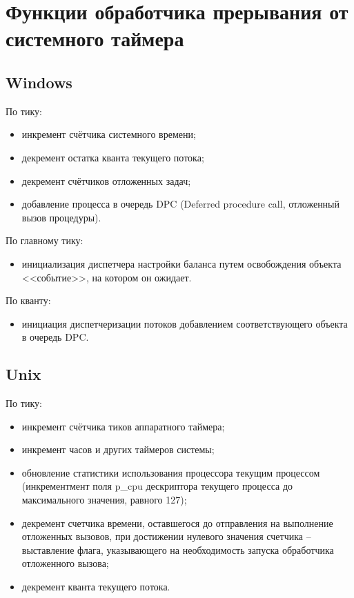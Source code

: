 \chapter{Функции обработчика прерывания от системного таймера}


\section{Windows}

По тику:
\begin{itemize}
	\item инкремент счётчика системного времени;
	\item декремент остатка кванта текущего потока;
	\item декремент счётчиков отложенных задач;
	\item добавление процесса в очередь DPC (Deferred procedure call, отложенный вызов процедуры). 
\end{itemize}

По главному тику: 
\begin{itemize}
	\item инициализация диспетчера настройки баланса путем освобождения объекта <<событие>>, на котором он ожидает.
\end{itemize}

По кванту:
\begin{itemize}
	\item инициация диспетчеризации потоков добавлением соответствующего объекта в очередь DPC.
\end{itemize}

\section{Unix}

По тику:

\begin{itemize}
	\item инкремент счётчика тиков аппаратного таймера;
	\item инкремент часов и других таймеров системы;
	\item обновление статистики использования процессора текущим процессом (инкрементмент поля p\_cpu дескриптора текущего процесса до максимального значения, равного 127);
	\item декремент счетчика времени, оставшегося до отправления на выполнение отложенных вызовов, при достижении нулевого значения счетчика -- выставление флага, указывающего на необходимость запуска обработчика отложенного вызова;
	\item декремент кванта текущего потока.
\end{itemize}


